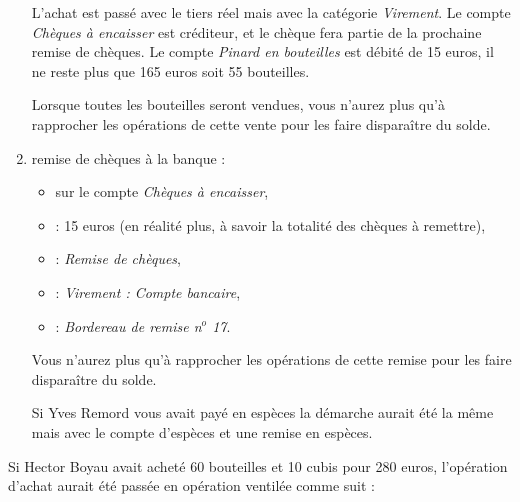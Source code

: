 \begin{enumerate}
L'achat est passé avec le tiers réel mais avec la catégorie \emph{Virement}. Le compte \emph{Chèques à encaisser} est créditeur, et le chèque fera partie de la prochaine remise de chèques. Le compte \emph{Pinard en bouteilles} est débité de 15 euros, il ne reste plus que 165 euros soit 55 bouteilles. 

Lorsque toutes les bouteilles seront vendues, vous n'aurez plus qu'à rapprocher les opérations de cette vente pour les faire disparaître du solde. 

	\item remise de chèques à la banque :
		\begin{itemize}
			\item sur le compte \emph{Chèques à encaisser},
			\item {} : 15 euros (en réalité plus, à savoir la totalité des chèques à remettre),
			\item {} : \emph{Remise de chèques},
			\item {} : \emph{Virement : Compte bancaire},
			\item {} : \emph{Bordereau de remise n$^o$ 17}.
		\end{itemize}

Vous n'aurez plus qu'à rapprocher les opérations de cette remise pour les faire disparaître du solde.
 
Si Yves Remord vous avait payé en espèces la démarche aurait été la même mais avec le compte d'espèces et une remise en espèces. 
\end{enumerate}

Si Hector Boyau avait acheté 60 bouteilles et 10 cubis pour 280 euros, l'opération d'achat aurait été passée en opération ventilée comme suit : 

